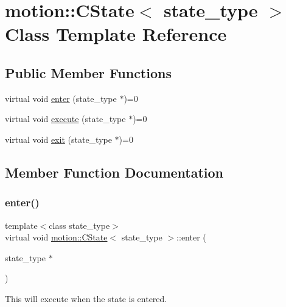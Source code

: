 \hypertarget{classmotion_1_1CState}{}\section{motion\+:\+:C\+State$<$ state\+\_\+type $>$ Class Template Reference}
\label{classmotion_1_1CState}
\subsection*{Public Member Functions}
\begin{DoxyCompactItemize}
\item 
virtual void \mbox{\hyperlink{classmotion_1_1CState_a53d5fcfec223b58ccdd364a8430fd23c}{enter}} (state\+\_\+type $\ast$)=0
\item 
virtual void \mbox{\hyperlink{classmotion_1_1CState_a71dc72d345b15bf3b5b5bff596a71f33}{execute}} (state\+\_\+type $\ast$)=0
\item 
virtual void \mbox{\hyperlink{classmotion_1_1CState_a353db064c159d66b82bf257b35e7c016}{exit}} (state\+\_\+type $\ast$)=0
\end{DoxyCompactItemize}


\subsection{Member Function Documentation}
\mbox{\label{classmotion_1_1CState_a53d5fcfec223b58ccdd364a8430fd23c}} 
\subsubsection{\texorpdfstring{enter()}{enter()}}
{\footnotesize\ttfamily template$<$class state\+\_\+type$>$ \\
virtual void \mbox{\hyperlink{classmotion_1_1CState}{motion\+::\+C\+State}}$<$ state\+\_\+type $>$\+::enter (\begin{DoxyParamCaption}\item[{state\+\_\+type $\ast$}]{ }\end{DoxyParamCaption})\hspace{0.3cm}{\ttfamily [pure virtual]}}

This will execute when the state is entered. 

